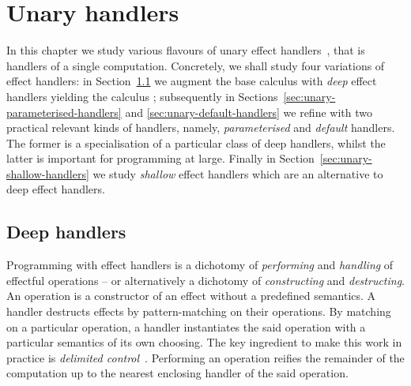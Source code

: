 \documentclass[12pt,phd,lfcs,twoside,openright,logo,leftchapter,normalheadings]{infthesis}
\theoremstyle{plain}
\theoremstyle{definition}
\begin{document}
\chapter{Unary handlers}
\label{ch:unary-handlers}
%
In this chapter we study various flavours of unary effect
handlers~\cite{PlotkinP13}, that is handlers of a single
computation. Concretely, we shall study four variations of effect
handlers: in Section~\ref{sec:unary-deep-handlers} we augment the base
calculus \BCalc{} with \emph{deep} effect handlers yielding the
calculus \HCalc{}; subsequently in
Sections~\ref{sec:unary-parameterised-handlers} and
\ref{sec:unary-default-handlers} we refine \HCalc{} with two practical
relevant kinds of handlers, namely, \emph{parameterised} and
\emph{default} handlers. The former is a specialisation of a
particular class of deep handlers, whilst the latter is important for
programming at large. Finally in
Section~\ref{sec:unary-shallow-handlers} we study \emph{shallow}
effect handlers which are an alternative to deep effect handlers.



\section{Deep handlers}
\label{sec:unary-deep-handlers}
%
Programming with effect handlers is a dichotomy of \emph{performing}
and \emph{handling} of effectful operations -- or alternatively a
dichotomy of \emph{constructing} and \emph{destructing}. An operation
is a constructor of an effect without a predefined semantics. A
handler destructs effects by pattern-matching on their operations. By
matching on a particular operation, a handler instantiates the said
operation with a particular semantics of its own choosing. The key
ingredient to make this work in practice is \emph{delimited
  control}~\cite{Landin65,Landin65a,Landin98,FelleisenF86,DanvyF90}. Performing
an operation reifies the remainder of the computation up to the
nearest enclosing handler of the said operation.
\end{document}
